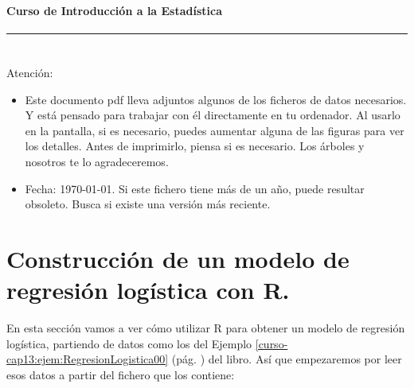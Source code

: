 \documentclass[10pt,a4paper]{article}\usepackage[]{graphicx}\usepackage[]{color}
\newcounter {cont01}
\begin{document}

\paragraph{\hspace{6.3cm}Curso de Introducción a la Estadística\\[2mm]} \noindent\hrule

\setcounter{section}{0}
\section*{\hspace{-0.1cm}} Atención:
\begin{itemize}
  \item Este documento pdf lleva adjuntos algunos de los ficheros de datos necesarios. Y está
      pensado para trabajar con él directamente en tu ordenador. Al usarlo en la pantalla, si es
      necesario, puedes aumentar alguna de las figuras para ver los detalles. Antes de
      imprimirlo, piensa si es necesario. Los árboles y nosotros te lo agradeceremos.
  \item Fecha: \today. Si este fichero tiene más de un año, puede resultar obsoleto. Busca si
      existe una versión más reciente.
\end{itemize}
\setcounter{tocdepth}{1}
\tableofcontents

\section{Construcción de un modelo de regresión logística con R.}

En esta sección vamos a  ver cómo utilizar R para obtener un modelo de regresión logística, partiendo de datos como los del Ejemplo \ref{curso-cap13:ejem:RegresionLogistica00} (pág. \pageref{curso-cap13:ejem:RegresionLogistica00}) del libro. Así que empezaremos por leer esos datos a partir del fichero que los contiene:
\end{document}
